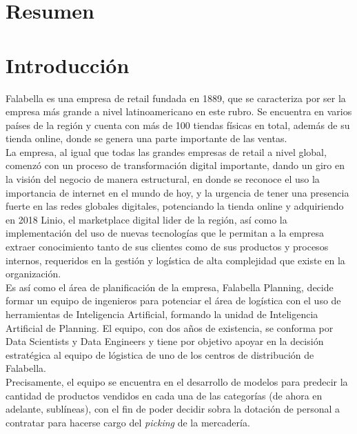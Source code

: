 \documentclass[12pt]{article}
\begin{document}

\tableofcontents
\pagebreak


\section{Resumen}
\section{Introducción}
Falabella es una empresa de retail fundada en 1889, que se caracteriza por ser la empresa más grande a nivel latinoamericano en este rubro. Se encuentra en varios países de la región y cuenta con más de 100 tiendas físicas en total, además de su tienda online, donde se genera una parte importante de las ventas. \\

La empresa, al igual que todas las grandes empresas de retail a nivel global, comenzó con un proceso de transformación digital importante, dando un giro en la visión del negocio de manera estructural, en donde se reconoce el uso la importancia de internet en el mundo de hoy, y la urgencia de tener una presencia fuerte en las redes globales digitales, potenciando la tienda online y adquiriendo en 2018 Linio, el marketplace digital lider de la región, así como la implementación del uso de nuevas tecnologías que le permitan a la empresa extraer conocimiento tanto de sus clientes como de sus productos y procesos internos, requeridos en la  gestión y logística de alta complejidad que existe en la organización.\\



Es así como el área de planificación de la empresa, Falabella Planning, decide formar un equipo de ingenieros para potenciar el área de logística con el uso de herramientas de Inteligencia Artificial, formando la unidad de Inteligencia Artificial de Planning. El equipo, con dos años de existencia, se conforma por Data Scientists y Data Engineers y tiene por objetivo apoyar en la decisión estratégica al equipo de lógistica de uno de los centros de distribución de Falabella.
\\Precisamente, el equipo se encuentra en el desarrollo de modelos para predecir la cantidad de productos vendidos en cada una de las categorías (de ahora en adelante, sublíneas), con el fin de poder decidir sobra la dotación de personal a contratar para hacerse cargo del \textit{picking} de la mercadería. \\
\end{document}
